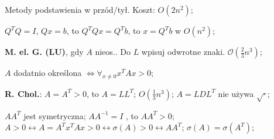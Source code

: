 
\entry
Metody podstawienia w przód/tył. Koszt: $O(2n^2)$;

\entry
$Q^TQ=I$, $Qx=b$, to $Q^TQx=Q^Tb$, to $x=Q^Tb$ w $O(n^2)$;




\entry
\textbf{M. el. G. (LU)}, gdy $A$ nieos..
Do $L$ wpisuj odwrotne znaki.
$\mathcal{O}(\frac{2}{3}n^3)$;

\entry
$A$ dodatnio określona $\iff \forall_{x \neq 0} x^TAx>0$;

\entry
\textbf{R. Chol.}:
$A=A^T>0$,
to
$A=LL^T$;
$O(\frac{1}{3}n^3)$;
$A=LDL^T$
nie używa
$\sqrt{\cdot}$;

\entry
$AA^T$ jest symetryczna;
\entry
$AA^{-1}=I$ , to $AA^T>0$;
\entry
$
A>0
\leftrightarrow A=A^Tx^TAx > 0
\leftrightarrow \sigma(A) > 0
\leftrightarrow AA^T
$;
\entry
$\sigma(A) = \sigma(A^T)$;
